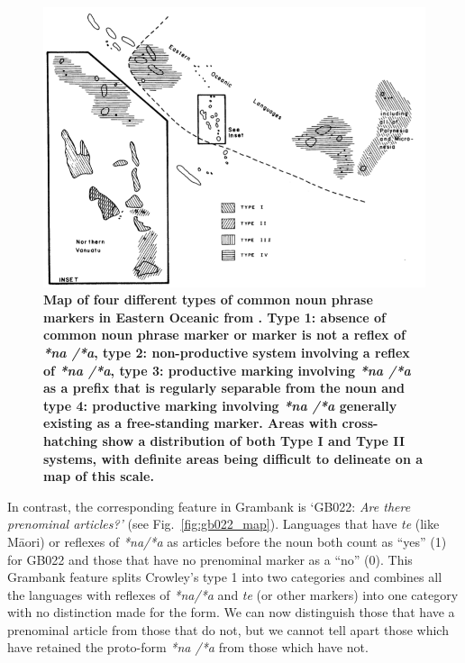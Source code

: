 \documentclass[12pt,letterpaper]{article}
\begin{document}
\begin{figure}[!ht]
\centering
\includegraphics[width=15cm]{illustrations/crowley_1985_map.png}
\caption[Map of four different types of common noun phrase markers in Eastern Oceanic from Crowley(1985).]{\textbf{Map of four different types of common noun phrase markers in Eastern Oceanic from \citet[162]{crowley1985common}. Type 1: absence of common noun phrase marker or marker is not a reflex of \emph{*na /*a}, type 2: non-productive system involving a reflex of \emph{*na /*a}, type 3: productive marking involving \emph{*na /*a} as a prefix that is regularly separable from the noun and type 4: productive marking involving \emph{*na /*a} generally existing as a free-standing marker. Areas with cross-hatching show a distribution of both Type I and Type II systems, with definite areas being difficult to delineate on a map of this scale.}}
\label{fig:crowley_map}
\end{figure}

In contrast, the corresponding feature in Grambank is `GB022: \emph{Are there prenominal articles?'} (see Fig.~\ref{fig:gb022_map}). Languages that have \emph{te} (like M\={a}ori) or reflexes of \emph{*na/*a} as articles before the noun both count as ``yes'' (1) for GB022 and those that have no prenominal marker as a ``no'' (0). This Grambank feature splits Crowley's type 1 into two categories and combines all the languages with reflexes of \emph{*na/*a} and \emph{te} (or other markers) into one category with no distinction made for the form. We can now distinguish those that have a prenominal article from those that do not, but we cannot tell apart those which have retained the proto-form \emph{*na /*a} from those which have not. 
\end{document}
